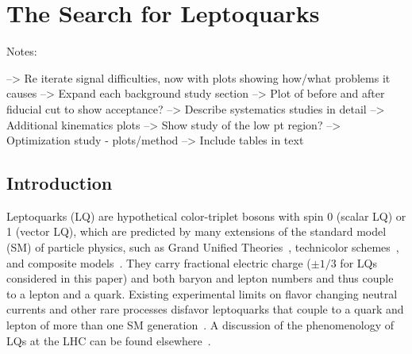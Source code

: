 
\chapter{The Search for Leptoquarks} %

\label{analysis} %





Notes:

--> Re iterate signal difficulties, now with plots showing how/what problems it causes
--> Expand each background study section
--> Plot of before and after fiducial cut to show acceptance?  
--> Describe systematics studies in detail
--> Additional kinematics plots
--> Show study of the low pt region?
--> Optimization study - plots/method
--> Include tables in text


\section{Introduction}
\label{introduction}

Leptoquarks (LQ) are hypothetical color-triplet bosons with spin 0 (scalar LQ) or 1 (vector LQ), which are predicted by many extensions of the standard model (SM) of particle physics, such as Grand Unified Theories~\cite{PhysRevLett.32.438,Pati:1973uk,Pati:1974yy,Murayama:1991ah,Fritzsch:1974nn,Senjanovic:1982ex,PhysRevLett.65.2209,Frampton:1990hz}, technicolor schemes~\cite{Dimopoulos:1979es,Dimopoulos:1979sp,Farhi:1980xs}, and composite models~\cite{Schrempp:1984nj}. They carry fractional electric charge ($\pm1/3$ for LQs considered in this paper) and both baryon and lepton numbers and thus couple to a lepton and a quark.  Existing experimental limits on flavor changing neutral currents and other rare processes disfavor leptoquarks that couple to a quark and lepton of more than one SM generation~\cite{Buchmuller:1986iq,FCNC}.  A discussion of the phenomenology of LQs at the LHC can be found elsewhere~\cite{Belyaev:2005ew}.

